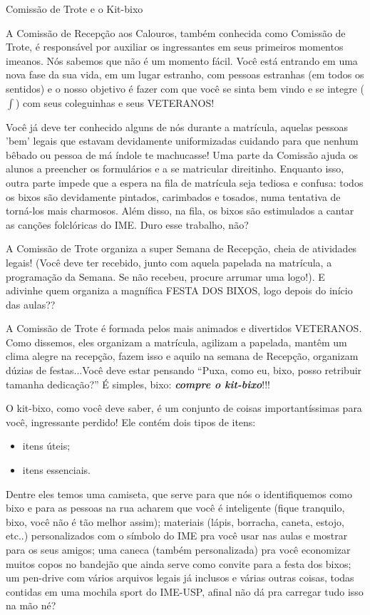 \begin{secao}{Comissão de Trote e o Kit-bixo}

A Comissão de Recepção aos Calouros, também conhecida como Comissão de Trote,
é responsável por auxiliar os ingressantes em seus primeiros momentos imeanos.
Nós sabemos que não é um momento fácil. Você está entrando em uma nova fase da
sua vida, em um lugar estranho, com pessoas estranhas (em todos os sentidos) e
o nosso objetivo é fazer com que você se sinta bem vindo e se integre ($\int$)
com seus coleguinhas e seus VETERANOS!

Você já deve ter conhecido alguns de nós durante a matrícula, aquelas pessoas
'bem' legais que estavam devidamente uniformizadas cuidando para que nenhum
bêbado ou pessoa de má índole te machucasse! Uma parte da Comissão ajuda os
alunos a preencher os formulários e a se matricular direitinho. Enquanto isso,
outra parte impede que a espera na fila de matrícula seja tediosa e confusa:
todos os bixos são devidamente pintados, carimbados e tosados, numa tentativa
de torná-los mais charmosos. Além disso, na fila, os bixos são estimulados a
cantar as canções folclóricas do IME. Duro esse trabalho, não?

A Comissão de Trote organiza a super Semana de Recepção, cheia de atividades
legais! (Você deve ter recebido, junto com aquela papelada na matrícula, a
programação da Semana. Se não recebeu, procure arrumar uma logo!).
E adivinhe quem organiza a magnífica FESTA DOS BIXOS, logo depois do início
das aulas??

A Comissão de Trote é formada pelos mais animados e divertidos VETERANOS. Como
dissemos, eles organizam a matrícula, agilizam a papelada, mantêm um clima
alegre na recepção, fazem isso e aquilo na semana de Recepção, organizam dúzias
de festas...Você deve estar pensando ``Puxa, como eu, bixo, posso retribuir
tamanha dedicação?'' É simples, bixo: {\bf\em compre o kit-bixo}!!!

O kit-bixo, como você deve saber, é um conjunto de coisas importantíssimas
para você, ingressante perdido! Ele contém dois tipos de itens:
\begin{itemize}
\item itens úteis;
\item itens essenciais. 
\end{itemize}
Dentre eles temos uma camiseta, que serve para que
nós o identifiquemos como bixo e para as pessoas na rua acharem que você é
inteligente (fique tranquilo, bixo, você não é tão melhor assim); materiais
(lápis, borracha, caneta, estojo, etc..) personalizados com o símbolo do IME pra
você usar nas aulas e mostrar para os seus amigos; uma caneca (também personalizada)
pra você economizar muitos copos no bandejão que ainda serve como convite para
a festa dos bixos; um pen-drive com vários arquivos legais já inclusos e várias
outras coisas, todas contidas em uma mochila sport do IME-USP, afinal não dá pra
carregar tudo isso na mão né?


\end{secao}
